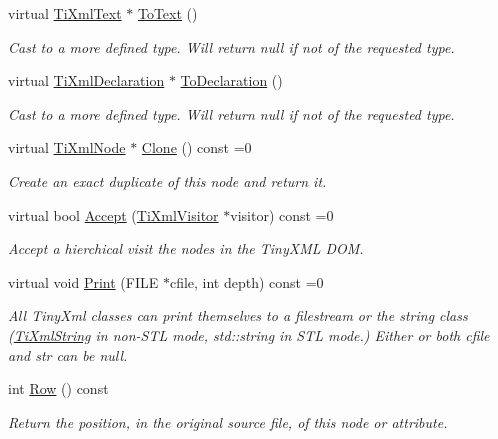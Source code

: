 \begin{DoxyCompactItemize}
virtual \hyperlink{classTiXmlText}{TiXmlText} $\ast$ \hyperlink{classTiXmlNode_a3ddfbcac78fbea041fad57e5c6d60a03}{ToText} ()
\begin{DoxyCompactList}\small\item\em Cast to a more defined type. Will return null if not of the requested type. \item\end{DoxyCompactList}\item 
virtual \hyperlink{classTiXmlDeclaration}{TiXmlDeclaration} $\ast$ \hyperlink{classTiXmlNode_a4027136ca820ff4a636b607231b6a6df}{ToDeclaration} ()
\begin{DoxyCompactList}\small\item\em Cast to a more defined type. Will return null if not of the requested type. \item\end{DoxyCompactList}\item 
virtual \hyperlink{classTiXmlNode}{TiXmlNode} $\ast$ \hyperlink{classTiXmlNode_a4508cc3a2d7a98e96a54cc09c37a78a4}{Clone} () const =0
\begin{DoxyCompactList}\small\item\em Create an exact duplicate of this node and return it. \item\end{DoxyCompactList}\item 
virtual bool \hyperlink{classTiXmlNode_acc0f88b7462c6cb73809d410a4f5bb86}{Accept} (\hyperlink{classTiXmlVisitor}{TiXmlVisitor} $\ast$visitor) const =0
\begin{DoxyCompactList}\small\item\em Accept a hierchical visit the nodes in the TinyXML DOM. \item\end{DoxyCompactList}\item 
virtual void \hyperlink{classTiXmlBase_a0de56b3f2ef14c65091a3b916437b512}{Print} (FILE $\ast$cfile, int depth) const =0
\begin{DoxyCompactList}\small\item\em All TinyXml classes can print themselves to a filestream or the string class (\hyperlink{classTiXmlString}{TiXmlString} in non-\/STL mode, std::string in STL mode.) Either or both cfile and str can be null. \item\end{DoxyCompactList}\item 
int \hyperlink{classTiXmlBase_a024bceb070188df92c2a8d8852dd0853}{Row} () const 
\begin{DoxyCompactList}\small\item\em Return the position, in the original source file, of this node or attribute. \item\end{DoxyCompactList}\item 

\end{DoxyCompactItemize}
